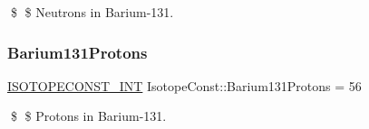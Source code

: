 \$ \$ Neutrons in Barium-\/131. \mbox{\label{group___isotope_const-_barium-_ba131_ga87397d89332af7cf3e1309cd711dd0dc}} 
\subsubsection{\texorpdfstring{Barium131\+Protons}{Barium131Protons}}
{\footnotesize\ttfamily \mbox{\hyperlink{group___isotope_const-_macros_ga5f18360b3e99483a35c32d789e62621c}{I\+S\+O\+T\+O\+P\+E\+C\+O\+N\+S\+T\+\_\+\+I\+NT}} Isotope\+Const\+::\+Barium131\+Protons = 56}

\$ \$ Protons in Barium-\/131. 
